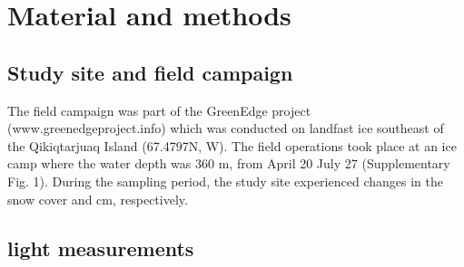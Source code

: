 \section{Material and methods}

\subsection{Study site and field campaign}

The field campaign was part of the GreenEdge project (www.greenedgeproject.info) which was conducted on landfast ice southeast of the Qikiqtarjuaq Island \DIFaddbegin {}\DIFaddend (67.4797N, \DIFdelbegin {}\DIFdelend \DIFaddbegin {}\DIFaddend W). The field operations took place at an ice camp where the water depth was 360 m, from April 20 \DIFdelbegin {}\DIFdelend \DIFaddbegin {}\DIFaddend July 27\DIFdelbegin {}\DIFdelend \DIFaddbegin \DIFadd{, } (Supplementary Fig. 1). During the sampling period, the study site experienced changes in the snow cover and \DIFdelbegin {}\DIFdelend \DIFaddbegin {}\DIFaddend cm, respectively.

\subsection{\DIFdelbegin {}\DIFdelend \DIFaddbegin {}\DIFaddend light measurements}

